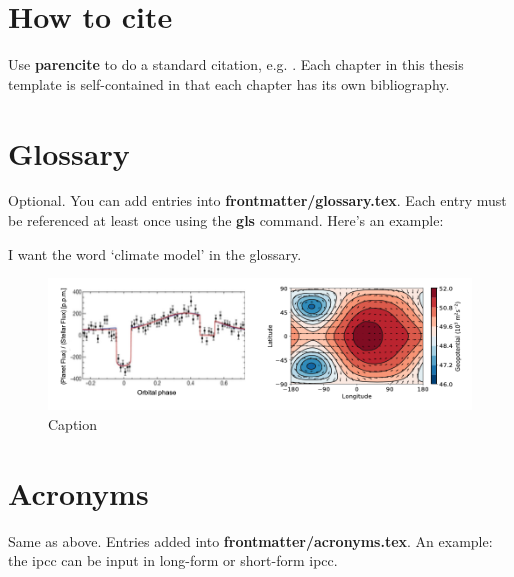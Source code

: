 \section{How to cite}
Use \textbf{parencite} to do a standard citation, e.g. \parencite{Elliott2016}. Each chapter in this thesis template is self-contained in that each chapter has its own bibliography. 

\section{Glossary}
Optional. You can add entries into \textbf{frontmatter/glossary.tex}. Each entry must be referenced at least once using the \textbf{gls} command. Here's an example:

I want the word `\gls{climate model}' in the glossary.

\begin{figure}
    \centering
    \includegraphics{figures/random-figure.png}
    \caption{Caption}
    \label{fig:my_label}
\end{figure}

\section{Acronyms}
Same as above. Entries added into \textbf{frontmatter/acronyms.tex}. An example: the \acrlong{ipcc} can be input in long-form or short-form \acrshort{ipcc}.
